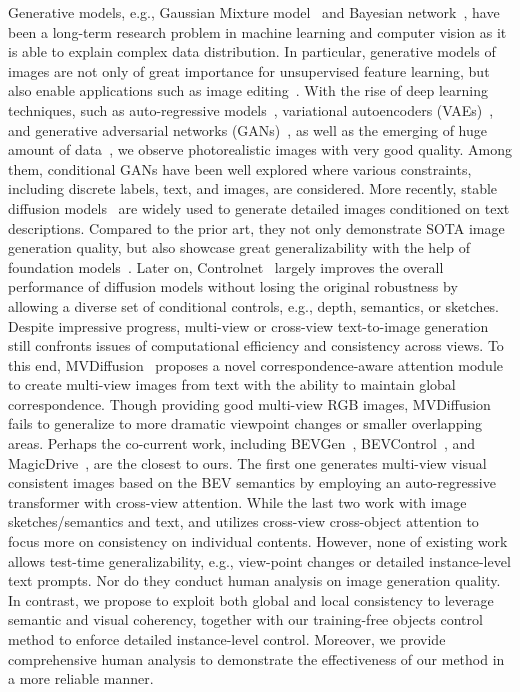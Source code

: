  Generative models, e.g., Gaussian Mixture model~\cite{rasmussen1999infinite} and Bayesian network~\cite{Jensen2001Bayesian}, have been a long-term research problem in machine learning and computer vision as it is able to explain complex data distribution. In particular, generative models of images are not only of great importance for unsupervised feature learning, but also enable applications such as image editing~\cite{imageedit,kawar2023imagic}. With the rise of deep learning techniques, such as auto-regressive models~\cite{chan2005probabilistic}, variational autoencoders (VAEs)~\cite{kingma2013auto}, and generative adversarial networks (GANs)~\cite{goodfellow2020generative}, as well as the emerging of huge amount of data~\cite{imagenet}, we observe photorealistic images with very good quality. Among them, conditional GANs have been well explored where various constraints, including discrete labels, text, and images, are considered. More recently, stable diffusion models~\cite{rombach2021highresolution} are widely used to generate detailed images conditioned on text descriptions. Compared to the prior art, they not only demonstrate SOTA image generation quality, but also showcase great generalizability with the help of foundation models~\cite{li2023blip}. Later on, Controlnet~\cite{zhang2023adding} largely improves the overall performance of diffusion models without losing the original robustness by allowing a diverse set of conditional controls, e.g., depth, semantics, or sketches. Despite impressive progress, multi-view or cross-view text-to-image generation still confronts issues of computational efficiency and consistency across views. To this end, MVDiffusion~\cite{Tang2023mvdiffusion} proposes a novel correspondence-aware attention module to create multi-view images from text with the ability to maintain global correspondence. Though providing good multi-view RGB images, MVDiffusion fails to generalize to more dramatic viewpoint changes or smaller overlapping areas. Perhaps the co-current work, including BEVGen~\cite{swerdlow2023street}, BEVControl~\cite{yang2023bevcontrol}, and MagicDrive~\cite{gao2023magicdrive},  are the closest to ours. The first one generates multi-view visual consistent images based on the BEV semantics by employing an auto-regressive transformer with cross-view attention. While the last two work with image sketches/semantics and text, and utilizes cross-view cross-object attention to focus more on consistency on individual contents. However, none of existing work allows test-time generalizability, e.g., view-point changes or detailed instance-level text prompts. Nor do they conduct human analysis on image generation quality. In contrast, we propose to exploit both global and local consistency to leverage semantic and visual coherency, together with our training-free objects control method to enforce detailed instance-level control. Moreover, we provide comprehensive human analysis to demonstrate the effectiveness of our method in a more reliable manner. 

